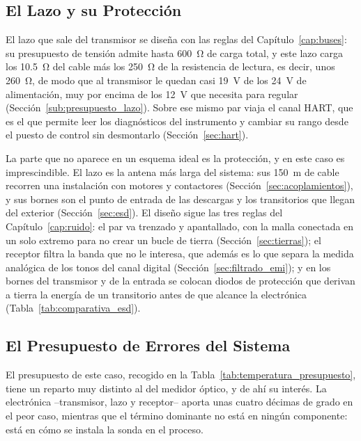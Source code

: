 \subsection{El Lazo y su Protección}\label{sub:temperatura_lazo}

El lazo que sale del transmisor se diseña con las reglas del Capítulo~\ref{cap:buses}: su presupuesto de tensión admite hasta \SI{600}{\ohm} de carga total, y este lazo carga los \SI{10.5}{\ohm} del cable más los \SI{250}{\ohm} de la resistencia de lectura, es decir, unos \SI{260}{\ohm}, de modo que al transmisor le quedan casi \SI{19}{\volt} de los \SI{24}{\volt} de alimentación, muy por encima de los \SI{12}{\volt} que necesita para regular (Sección~\ref{sub:presupuesto_lazo}). Sobre ese mismo par viaja el canal HART, que es el que permite leer los diagnósticos del instrumento y cambiar su rango desde el puesto de control sin desmontarlo (Sección~\ref{sec:hart}).

La parte que no aparece en un esquema ideal es la protección, y en este caso es imprescindible. El lazo es la antena más larga del sistema: sus \SI{150}{\meter} de cable recorren una instalación con motores y contactores (Sección~\ref{sec:acoplamientos}), y sus bornes son el punto de entrada de las descargas y los transitorios que llegan del exterior (Sección~\ref{sec:esd}). El diseño sigue las tres reglas del Capítulo~\ref{cap:ruido}: el par va trenzado y apantallado, con la malla conectada en un solo extremo para no crear un bucle de tierra (Sección~\ref{sec:tierras}); el receptor filtra la banda que no le interesa, que además es lo que separa la medida analógica de los tonos del canal digital (Sección~\ref{sec:filtrado_emi}); y en los bornes del transmisor y de la entrada se colocan diodos de protección que derivan a tierra la energía de un transitorio antes de que alcance la electrónica (Tabla~\ref{tab:comparativa_esd}).

\subsection{El Presupuesto de Errores del Sistema}\label{sub:temperatura_presupuesto}

El presupuesto de este caso, recogido en la Tabla~\ref{tab:temperatura_presupuesto}, tiene un reparto muy distinto al del medidor óptico, y de ahí su interés. La electrónica --transmisor, lazo y receptor-- aporta unas cuatro décimas de grado en el peor caso, mientras que el término dominante no está en ningún componente: está en cómo se instala la sonda en el proceso.

